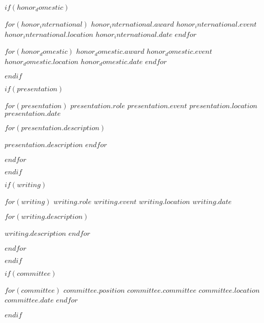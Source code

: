 \documentclass[11pt, a4paper]{awesome-cv}
\begin{document}
$if(honor_domestic)$


\begin{cvhonors}
  $for(honor_international)$
  \cvhonor
  {$honor_international.award$} %
  {$honor_international.event$} %
  {$honor_international.location$} %
  {$honor_international.date$} %
  $endfor$
\end{cvhonors}


\begin{cvhonors}
  $for(honor_domestic)$
  \cvhonor
  {$honor_domestic.award$} %
  {$honor_domestic.event$} %
  {$honor_domestic.location$} %
  {$honor_domestic.date$} %
  $endfor$
\end{cvhonors}
$endif$


$if(presentation)$

\begin{cventries}
  $for(presentation)$
  \cventry
  {$presentation.role$} %
  {$presentation.event$} %
  {$presentation.location$} %
  {$presentation.date$} %
  {
  \begin{cvitems}
    $for(presentation.description)$
    \item {$presentation.description$}
    $endfor$
  \end{cvitems}
  }
  $endfor$
\end{cventries}
$endif$


$if(writing)$

\begin{cventries}
  $for(writing)$
  \cventry
  {$writing.role$} %
  {$writing.event$} %
  {$writing.location$} %
  {$writing.date$} %
  {
  \begin{cvitems}
    $for(writing.description)$
    \item {$writing.description$}
    $endfor$
  \end{cvitems}
  }
  $endfor$
\end{cventries}
$endif$


$if(committee)$

\begin{cvhonors}
  $for(committee)$
  \cvhonor
  {$committee.position$} %
  {$committee.committee$} %
  {$committee.location$} %
  {$committee.date$} %
  $endfor$
\end{cvhonors}
$endif$
\end{document}
